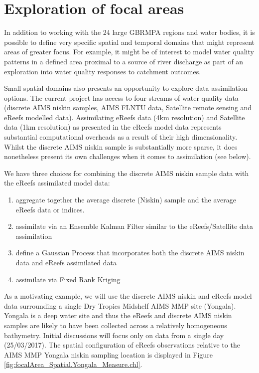\section{Exploration of focal areas}

In addition to working with the 24 large GBRMPA regions and water bodies, it is possible to define
very specific spatial and temporal domains that might represent areas of greater focus.  For
example, it might be of interest to model water quality patterns in a defined area proximal to a
source of river discharge as part of an exploration into water quality responses to catchment
outcomes.

Small spatial domains also presents an opportunity to explore data assimilation options.  The current
project has access to four streams of water quality data (discrete AIMS niskin samples, AIMS FLNTU
data, Satellite remote sensing and eReefs modelled data).  Assimilating eReefs data (4km resolution)
and Satellite data (1km resolution) as presented in the eReefs model data represents substantial
computational overheads as a result of their high dimensionality.  Whilst the discrete AIMS niskin
sample is substantially more sparse, it does nonetheless present its own challenges when it comes to
assimilation (see below).
 
We have three choices for combining the discrete AIMS niskin sample data with the eReefs assimilated
model data:
\begin{enumerate}
\item aggregate together the average discrete (Niskin) sample and the average eReefs data
or indices.
\item assimilate via an Ensemble Kalman Filter similar to the eReefs/Satellite data assimilation
\item define a Gaussian Process that incorporates both the discrete AIMS niskin data and eReefs
  assimilated data
\item assimilate via Fixed Rank Kriging 
\end{enumerate}

As a motivating example, we will use the discrete AIMS niskin and eReefs model data surrounding a
single Dry Tropics Midshelf AIMS MMP site (Yongala).  Yongala is a deep water site and thus the
eReefs and discrete AIMS niskin samples are likely to have been collected across a relatively
homogeneous bathymetry.  Initial discussions will focus only on data from a single day (25/03/2017).
The spatial configuration of eReefs observations relative to the AIMS MMP Yongala niskin sampling
location is displayed in Figure \ref{fig:focalArea_Spatial.Yongala_Measure.chl}. 


